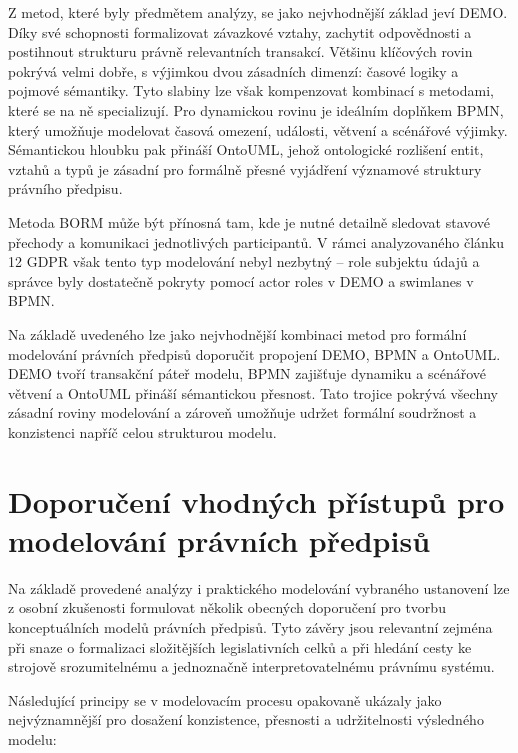 Z metod, které byly předmětem analýzy, se jako nejvhodnější základ jeví DEMO. Díky své schopnosti formalizovat závazkové vztahy, zachytit odpovědnosti a postihnout strukturu právně relevantních transakcí. Většinu klíčových rovin pokrývá velmi dobře, s výjimkou dvou zásadních dimenzí: časové logiky a pojmové sémantiky. Tyto slabiny lze však kompenzovat kombinací s metodami, které se na ně specializují. Pro dynamickou rovinu je ideálním doplňkem BPMN, který umožňuje modelovat časová omezení, události, větvení a scénářové výjimky. Sémantickou hloubku pak přináší OntoUML, jehož ontologické rozlišení entit, vztahů a typů je zásadní pro formálně přesné vyjádření významové struktury právního předpisu.

Metoda BORM může být přínosná tam, kde je nutné detailně sledovat stavové přechody a komunikaci jednotlivých participantů. V rámci analyzovaného článku 12 GDPR však tento typ modelování nebyl nezbytný – role subjektu údajů a správce byly dostatečně pokryty pomocí actor roles v DEMO a swimlanes v BPMN.

Na základě uvedeného lze jako nejvhodnější kombinaci metod pro formální modelování právních předpisů doporučit propojení DEMO, BPMN a OntoUML. DEMO tvoří transakční páteř modelu, BPMN zajišťuje dynamiku a scénářové větvení a OntoUML přináší sémantickou přesnost. Tato trojice pokrývá všechny zásadní roviny modelování a zároveň umožňuje udržet formální soudržnost a konzistenci napříč celou strukturou modelu.


\section{Doporučení vhodných přístupů pro modelování právních předpisů}
\label{sec:doporuceni-modelovani}

Na základě provedené analýzy i praktického modelování vybraného ustanovení lze z osobní zkušenosti formulovat několik obecných doporučení pro tvorbu konceptuálních modelů právních předpisů. Tyto závěry jsou relevantní zejména při snaze o formalizaci složitějších legislativních celků a při hledání cesty ke strojově srozumitelnému a jednoznačně interpretovatelnému právnímu systému.

Následující principy se v modelovacím procesu opakovaně ukázaly jako nejvýznamnější pro dosažení konzistence, přesnosti a udržitelnosti výsledného modelu:

